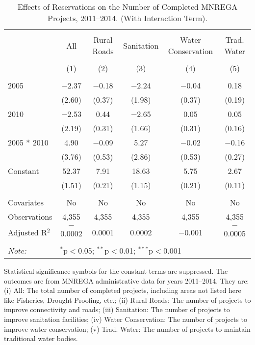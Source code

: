 \begin{table}[!htbp]
\centering
\begin{threeparttable}

  \caption{Effects of Reservations on the Number of Completed MNREGA Projects, 2011--2014. (With Interaction Term).} 
  \label{main_mnrega_interaction} 
\scriptsize 
\begin{tabular}{@{\extracolsep{0pt}}lccccc} 
\\[-1.8ex]\hline 
\hline \\[-1.8ex] 
 & All & Rural Roads & Sanitation & Water Conservation & Trad. Water \\ 
\\[-1.8ex] & (1) & (2) & (3) & (4) & (5)\\ 
\hline \\[-1.8ex] 
 2005 & $-$2.37 & $-$0.18 & $-$2.24 & $-$0.04 & 0.18 \\ 
  & (2.60) & (0.37) & (1.98) & (0.37) & (0.19) \\ 
  2010 & $-$2.53 & 0.44 & $-$2.65 & 0.05 & 0.05 \\ 
  & (2.19) & (0.31) & (1.66) & (0.31) & (0.16) \\ 
  2005 * 2010 & 4.90 & $-$0.09 & 5.27 & $-$0.02 & $-$0.16 \\ 
  & (3.76) & (0.53) & (2.86) & (0.53) & (0.27) \\ 
  Constant & 52.37 & 7.91 & 18.63 & 5.75 & 2.67 \\ 
  & (1.51) & (0.21) & (1.15) & (0.21) & (0.11) \\ 
 \hline \\[-1.8ex] 
Covariates & No & No & No & No & No \\ 
Observations & 4,355 & 4,355 & 4,355 & 4,355 & 4,355 \\ 
Adjusted R$^{2}$ & $-$0.0002 & 0.0001 & 0.0002 & $-$0.001 & $-$0.0005 \\ 
\hline 
\hline \\[-1.8ex] 
\textit{Note:}  & \multicolumn{5}{l}{$^{*}$p$<$0.05; $^{**}$p$<$0.01; $^{***}$p$<$0.001} \\ 
\end{tabular} 
\begin{tablenotes}[flushleft]
\scriptsize
\item[] Statistical significance symbols for the constant terms are suppressed. The outcomes are from MNREGA administrative data for years 2011--2014. They are: 
(i) All: The total number of completed projects, including areas not listed here like Fisheries, Drought Proofing, etc.;
(ii) Rural Roads: The number of projects to improve connectivity and roads;
(iii) Sanitation: The number of projects to improve sanitation facilities;
(iv) Water Conservation: The number of projects to improve water conservation;
(v) Trad. Water: The number of projects to maintain traditional water bodies.
\end{tablenotes}
\end{threeparttable}
\end{table}
